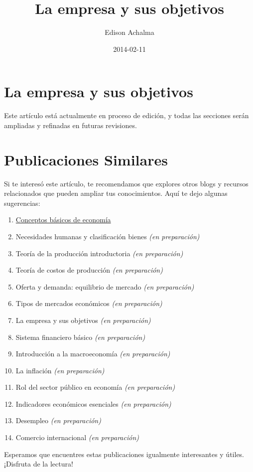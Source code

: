 \documentclass[
  jou,
  floatsintext,
  longtable,
  a4paper,
  nolmodern,
  notxfonts,
  notimes,
  12pt,
  colorlinks=true,linkcolor=blue,citecolor=blue,urlcolor=blue]{apa7}
\title{La empresa y sus objetivos}
\author{Edison Achalma}
\affiliation{
{Escuela Profesional de Economía, Universidad Nacional de San Cristóbal
de Huamanga}}
\date{2014-02-11}
\providecommand{\tightlist}{%
  \setlength{\itemsep}{0pt}\setlength{\parskip}{0pt}}
\begin{document}
\maketitle


\hypertarget{toc}{}
\tableofcontents
\newpage
\section[Introduction]{La empresa y sus objetivos}

\setcounter{secnumdepth}{3}

\setlength\LTleft{0pt}




Este artículo está actualmente en proceso de edición, y todas las
secciones serán ampliadas y refinadas en futuras revisiones.

\section{Publicaciones Similares}\label{publicaciones-similares}

Si te interesó este artículo, te recomendamos que explores otros blogs y
recursos relacionados que pueden ampliar tus conocimientos. Aquí te dejo
algunas sugerencias:

\begin{enumerate}
\def\labelenumi{\arabic{enumi}.}
\tightlist
\item
  \href{https://achalmaedison.netlify.app/cursos/pre_economia/2014-i/sesiones/01-conceptos-basicos-de-economia/index.pdf}{}
  \href{https://achalmaedison.netlify.app/cursos/pre_economia/2014-i/sesiones/01-conceptos-basicos-de-economia}{Conceptos
  básicos de economía}
\item
  Necesidades humanas y clasificación bienes \emph{(en preparación)}
\item
  Teoría de la producción introductoria \emph{(en preparación)}
\item
  Teoría de costos de producción \emph{(en preparación)}
\item
  Oferta y demanda: equilibrio de mercado \emph{(en preparación)}
\item
  Tipos de mercados económicos \emph{(en preparación)}
\item
  La empresa y sus objetivos \emph{(en preparación)}
\item
  Sistema financiero básico \emph{(en preparación)}
\item
  Introducción a la macroeconomía \emph{(en preparación)}
\item
  La inflación \emph{(en preparación)}
\item
  Rol del sector público en economía \emph{(en preparación)}
\item
  Indicadores económicos esenciales \emph{(en preparación)}
\item
  Desempleo \emph{(en preparación)}
\item
  Comercio internacional \emph{(en preparación)}
\end{enumerate}

Esperamos que encuentres estas publicaciones igualmente interesantes y
útiles. ¡Disfruta de la lectura!
\end{document}
